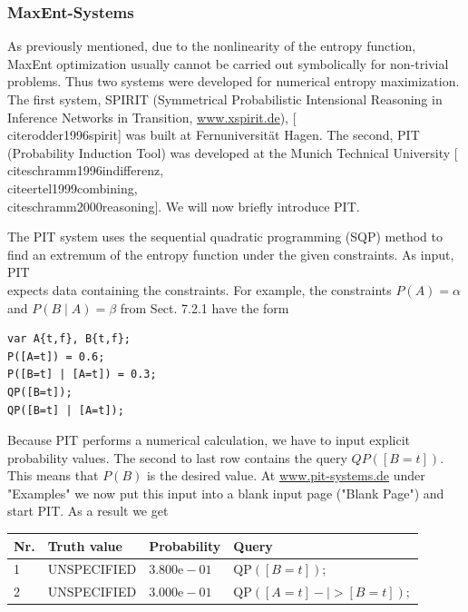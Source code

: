\documentclass[10pt]{book}
\begin{document}
\subsubsection*{MaxEnt-Systems}
As previously mentioned, due to the nonlinearity of the entropy function, MaxEnt optimization usually cannot be carried out symbolically for non-trivial problems. Thus two systems were developed for numerical entropy maximization. The first system, SPIRIT (Symmetrical Probabilistic Intensional Reasoning in Inference Networks in Transition, \href{http://www.xspirit.de}{www.xspirit.de}), [\\cite{rodder1996spirit}] was built at Fernuniversität Hagen. The second, PIT (Probability Induction Tool) was developed at the Munich Technical University [\\cite{schramm1996indifferenz}, \\cite{ertel1999combining}, \\cite{schramm2000reasoning}]. We will now briefly introduce PIT.

The PIT system uses the sequential quadratic programming (SQP) method to find an extremum of the entropy function under the given constraints. As input, PIT\\
expects data containing the constraints. For example, the constraints $P(A)=\alpha$ and $P(B \mid A)=\beta$ from Sect. 7.2.1 have the form


\begin{verbatim}
var A{t,f}, B{t,f};
P([A=t]) = 0.6;
P([B=t] | [A=t]) = 0.3;
QP([B=t]);
QP([B=t] | [A=t]);
\end{verbatim}

Because PIT performs a numerical calculation, we have to input explicit probability values. The second to last row contains the query $Q P([B=t])$. This means that $P(B)$ is the desired value. At \href{http://www.pit-systems.de}{www.pit-systems.de} under "Examples" we now put this input into a blank input page ("Blank Page") and start PIT. As a result we get

\begin{center}
\begin{tabular}{llll}
\hline
Nr. & Truth value & Probability & Query \\
\hline
1 & UNSPECIFIED & $3.800 \mathrm{e}-01$ & $\mathrm{QP}([B=t]) ;$ \\
\hline
2 & UNSPECIFIED & $3.000 \mathrm{e}-01$ & $\mathrm{QP}([A=t]-\mid>[B=t]) ;$ \\
\hline
\end{tabular}
\end{center}
\end{document}
